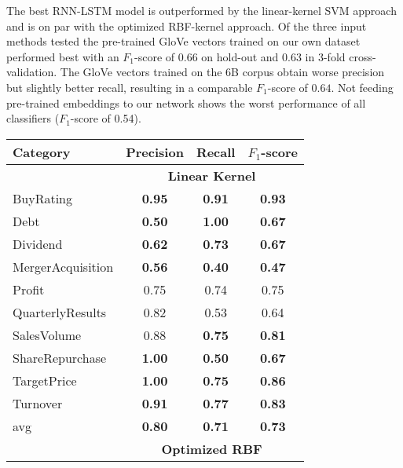 \documentclass[11pt,a4paper]{article}
\begin{document}
The best RNN-LSTM model is outperformed by the linear-kernel SVM approach and is on par with the optimized RBF-kernel approach.
Of the three input methods tested the pre-trained GloVe vectors trained on our own dataset performed best with an $F_1$-score of $0.66$ on hold-out and $0.63$ in 3-fold cross-validation.
The GloVe vectors trained on the 6B corpus obtain worse precision but slightly better recall, resulting in a comparable $F_1$-score of $0.64$.
Not feeding pre-trained embeddings to our network shows the worst performance of all classifiers ($F_1$-score of 0.54).


\begin{table}[ht!]
	\centering
	\small{
		\begin{tabular}{p{2.8cm} c c c} 
			\hline
			\textbf{Category} & \textbf{Precision} & \textbf{Recall} & \textbf{$F_1$-score} \\ 
			\hline \hline
			& \multicolumn{3}{c}{\textbf{Linear Kernel} } \\
			\hline
			BuyRating         & \textbf{0.95}      & \textbf{0.91}   & \textbf{0.93}        \\
			Debt              & \textbf{0.50}      & \textbf{1.00}   & \textbf{0.67}        \\
			Dividend          & \textbf{0.62}      & \textbf{0.73}   & \textbf{0.67}        \\
			MergerAcquisition & \textbf{0.56}      & \textbf{0.40}   & \textbf{0.47}        \\
			Profit            & 0.75               & 0.74            & 0.75                 \\
			QuarterlyResults  & 0.82               & 0.53            & 0.64                 \\
			SalesVolume       & 0.88               & \textbf{0.75}   & \textbf{0.81}        \\
			ShareRepurchase   & \textbf{1.00}      & \textbf{0.50}   & \textbf{0.67}        \\ 
			TargetPrice       & \textbf{1.00}      & \textbf{0.75}   & \textbf{0.86}        \\
			Turnover          & \textbf{0.91}      & \textbf{0.77}   & \textbf{0.83}        \\
			\hline                                                                          
			avg               & \textbf{0.80}      & \textbf{0.71}   & \textbf{0.73}        \\
			\hline \hline
			& \multicolumn{3}{c}{\textbf{Optimized RBF} }                                   \\

\end{tabular}}
\end{table}
\end{document}
